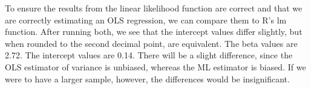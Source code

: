 \documentclass[12pt,letterpaper]{article}
\begin{document}
\begin{description}
	\item\noindent To ensure the results from the linear likelihood function are correct and that we are correctly estimating an OLS regression, we can compare them to R's lm function. After running both, we see that the intercept values differ slightly, but when rounded to the second decimal point, are equivalent. The beta values are 2.72. The intercept values are 0.14. There will be a slight difference, since the OLS estimator of variance is unbiased, whereas the ML estimator is biased. If we were to have a larger sample, however, the differences would be insignificant.
\end{description}
\end{document}
